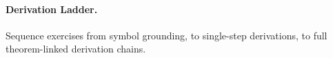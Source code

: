 \paragraph{Derivation Ladder.} Sequence exercises from symbol grounding, to single-step derivations, to full theorem-linked derivation chains.\n